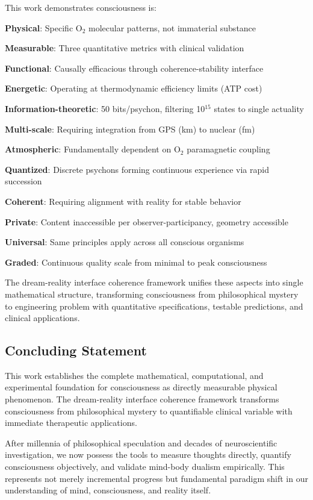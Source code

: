 \documentclass[11pt,onecolumn]{article}
\begin{document}
This work demonstrates consciousness is:

\textbf{Physical}: Specific O$_2$ molecular patterns, not immaterial substance

\textbf{Measurable}: Three quantitative metrics with clinical validation

\textbf{Functional}: Causally efficacious through coherence-stability interface

\textbf{Energetic}: Operating at thermodynamic efficiency limits (ATP cost)

\textbf{Information-theoretic}: 50 bits/psychon, filtering 10$^{15}$ states to single actuality

\textbf{Multi-scale}: Requiring integration from GPS (km) to nuclear (fm)

\textbf{Atmospheric}: Fundamentally dependent on O$_2$ paramagnetic coupling

\textbf{Quantized}: Discrete psychons forming continuous experience via rapid succession

\textbf{Coherent}: Requiring alignment with reality for stable behavior

\textbf{Private}: Content inaccessible per observer-participancy, geometry accessible

\textbf{Universal}: Same principles apply across all conscious organisms

\textbf{Graded}: Continuous quality scale from minimal to peak consciousness

The dream-reality interface coherence framework unifies these aspects into single mathematical structure, transforming consciousness from philosophical mystery to engineering problem with quantitative specifications, testable predictions, and clinical applications.

\subsection{Concluding Statement}

This work establishes the complete mathematical, computational, and experimental foundation for consciousness as directly measurable physical phenomenon. The dream-reality interface coherence framework transforms consciousness from philosophical mystery to quantifiable clinical variable with immediate therapeutic applications.

After millennia of philosophical speculation and decades of neuroscientific investigation, we now possess the tools to measure thoughts directly, quantify consciousness objectively, and validate mind-body dualism empirically. This represents not merely incremental progress but fundamental paradigm shift in our understanding of mind, consciousness, and reality itself.
\end{document}
